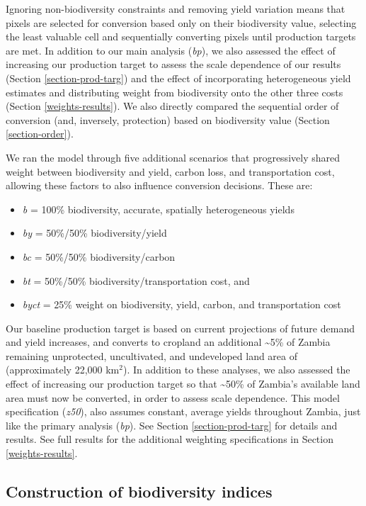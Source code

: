 \documentclass[
]{article}
\providecommand{\tightlist}{%
  \setlength{\itemsep}{0pt}\setlength{\parskip}{0pt}}
\begin{document}
Ignoring non-biodiversity constraints and removing yield variation means that pixels are selected for conversion based only on their biodiversity value, selecting the least valuable cell and sequentially converting pixels until production targets are met. In addition to our main analysis (\emph{bp}), we also assessed the effect of increasing our production target to assess the scale dependence of our results (Section \ref{section-prod-targ}) and the effect of incorporating heterogeneous yield estimates and distributing weight from biodiversity onto the other three costs (Section \ref{weights-results}). We also directly compared the sequential order of conversion (and, inversely, protection) based on biodiversity value (Section \ref{section-order}).

We ran the model through five additional scenarios that progressively shared weight between biodiversity and yield, carbon loss, and transportation cost, allowing these factors to also influence conversion decisions. These are:

\begin{itemize}
\tightlist
\item
  \emph{b} = 100\% biodiversity, accurate, spatially heterogeneous yields
\item
  \emph{by} = 50\%/50\% biodiversity/yield
\item
  \emph{bc} = 50\%/50\% biodiversity/carbon
\item
  \emph{bt} = 50\%/50\% biodiversity/transportation cost, and
\item
  \emph{byct} = 25\% weight on biodiversity, yield, carbon, and transportation cost
\end{itemize}

Our baseline production target is based on current projections of future demand and yield increases, and converts to cropland an additional \textasciitilde5\% of Zambia remaining unprotected, uncultivated, and undeveloped land area of (approximately 22,000 km\(^2\)). In addition to these analyses, we also assessed the effect of increasing our production target so that \textasciitilde50\% of Zambia's available land area must now be converted, in order to assess scale dependence. This model specification (\emph{z50}), also assumes constant, average yields throughout Zambia, just like the primary analysis (\emph{bp}). See Section \ref{section-prod-targ} for details and results. See full results for the additional weighting specifications in Section \ref{weights-results}.

\hypertarget{bd-inputs}{%
\subsection{Construction of biodiversity indices}\label{bd-inputs}}
\end{document}
